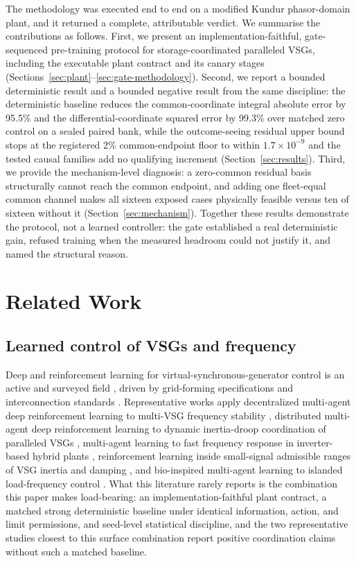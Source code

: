 \documentclass[journal]{IEEEtran}
\begin{document}
The methodology was executed end to end on a modified Kundur phasor-domain plant, and it returned a complete, attributable verdict. We summarise the contributions as follows. First, we present an implementation-faithful, gate-sequenced pre-training protocol for storage-coordinated paralleled VSGs, including the executable plant contract and its canary stages (Sections~\ref{sec:plant}--\ref{sec:gate-methodology}). Second, we report a bounded deterministic result and a bounded negative result from the same discipline: the deterministic baseline reduces the common-coordinate integral absolute error by 95.5\% and the differential-coordinate squared error by 99.3\% over matched zero control on a sealed paired bank, while the outcome-seeing residual upper bound stops at the registered 2\% common-endpoint floor to within $1.7\times10^{-9}$ and the tested causal families add no qualifying increment (Section~\ref{sec:results}). Third, we provide the mechanism-level diagnosis: a zero-common residual basis structurally cannot reach the common endpoint, and adding one fleet-equal common channel makes all sixteen exposed cases physically feasible versus ten of sixteen without it (Section~\ref{sec:mechanism}). Together these results demonstrate the protocol, not a learned controller: the gate established a real deterministic gain, refused training when the measured headroom could not justify it, and named the structural reason.

\section{Related Work}
\label{sec:related-work}

\subsection{Learned control of VSGs and frequency}
Deep and reinforcement learning for virtual-synchronous-generator control is an active and surveyed field \cite{ding2024deep}, driven by grid-forming specifications and interconnection standards \cite{ieee2800,nerc2023grid,unifi2024specifications}. Representative works apply decentralized multi-agent deep reinforcement learning to multi-VSG frequency stability \cite{kang2025enhancing}, distributed multi-agent deep reinforcement learning to dynamic inertia-droop coordination of paralleled VSGs \cite{yang2023distributed}, multi-agent learning to fast frequency response in inverter-based hybrid plants \cite{ikram2026novel}, reinforcement learning inside small-signal admissible ranges of VSG inertia and damping \cite{benhmidouch2024novel}, and bio-inspired multi-agent learning to islanded load-frequency control \cite{li2024bioinspired}. What this literature rarely reports is the combination this paper makes load-bearing: an implementation-faithful plant contract, a matched strong deterministic baseline under identical information, action, and limit permissions, and seed-level statistical discipline, and the two representative studies closest to this surface combination \cite{kang2025enhancing,yang2023distributed} report positive coordination claims without such a matched baseline.
\end{document}
